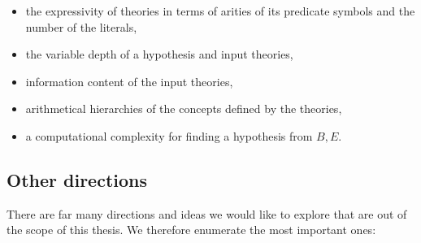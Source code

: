 \begin{itemize}
\item the expressivity of theories in terms of arities of its predicate symbols and the number of the literals,
\item the variable depth of a hypothesis and input theories, 
\item information content of the input theories,
\item arithmetical hierarchies of the concepts defined by the theories,
\item a computational complexity for finding a hypothesis from $B, E$.
\end{itemize}

\subsection{Other directions}
There are far many directions and ideas we would like to explore that are out of the scope of this thesis. We therefore enumerate the most important ones:
